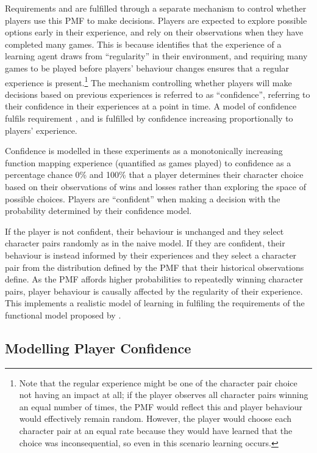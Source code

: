 Requirements  and  are fulfilled through a separate
mechanism to control whether players use this PMF to make decisions. Players are
expected to explore possible options early in their experience, and rely on
their observations when they have completed many games. This is because
\citet{lachman1997learning} identifies that the experience of a learning agent
draws from ``regularity'' in their environment, and requiring many games to be
played before players' behaviour changes ensures that a regular experience is
present.\footnote{Note that the regular experience might be one of the character
pair choice not having an impact at all; if the player observes all character
pairs winning an equal number of times, the PMF would reflect this and player
behaviour would effectively remain random. However, the player would choose each
character pair at an equal rate because they would have learned that the choice
was inconsequential, so even in this scenario learning occurs.} The mechanism
controlling whether players will make decisions based on previous experiences is
referred to as ``confidence'', referring to their confidence in their experiences at a
point in time. A model of confidence fulfils requirement , and
 is fulfilled by confidence increasing proportionally to players'
experience.


Confidence is modelled in these experiments as a monotonically increasing
function mapping experience (quantified as games played) to confidence as
a percentage chance 0\% and 100\% that a player determines their
character choice based on their observations of wins and losses rather than
exploring the space of possible choices. Players are ``confident'' when making a
decision with the probability determined by their confidence model.

If the player is not confident, their behaviour is unchanged and they select
character pairs randomly as in the naive model. If they are confident, their
behaviour is instead informed by their experiences and they select a character
pair from the distribution defined by the PMF that their historical observations
define. As the PMF affords higher probabilities to repeatedly winning character
pairs, player behaviour is causally affected by the regularity of their
experience. This implements a realistic model of learning in fulfiling the
requirements of the functional model proposed by \citet{lachman1997learning}.

\subsection{Modelling Player Confidence}\label{subsec:confidence_model}

